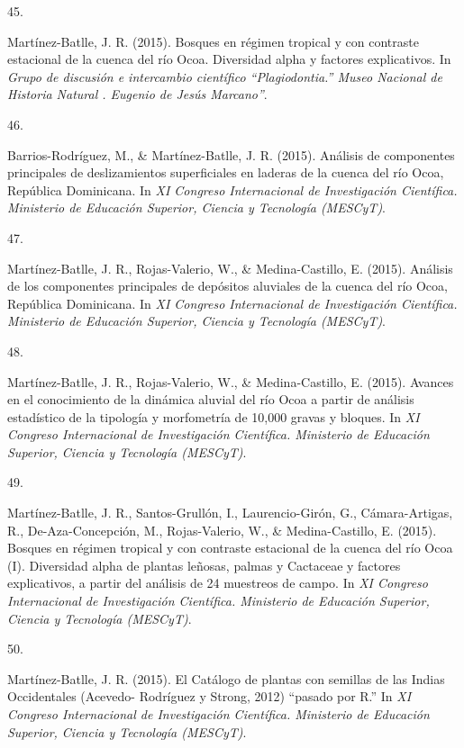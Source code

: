 \documentclass[10pt,a4paper,]{article}
\newlength{\cslhangindent}
\newlength{\csllabelwidth}
\newcommand{\CSLLeftMargin}[1]{\parbox[t]{\csllabelwidth}{\hfill #1~}}
\newcommand{\CSLRightInline}[1]{\parbox[t]{\linewidth - \cslhangindent - \csllabelwidth}{#1}\vspace{0.8ex}}
\begin{document}
\leavevmode\hypertarget{ref-Jose_Ramon_Martinez-Batlle_108095931}{}%
\CSLLeftMargin{45. }
\CSLRightInline{Martínez-Batlle, J. R. (2015). Bosques en régimen
tropical y con contraste estacional de la cuenca del río Ocoa.
Diversidad alpha y factores explicativos. In \emph{Grupo de discusión e
intercambio científico {``Plagiodontia.''} Museo Nacional de Historia
Natural . Eugenio de Jesús Marcano''}.}

\leavevmode\hypertarget{ref-Jose_Ramon_Martinez-Batlle_108046725}{}%
\CSLLeftMargin{46. }
\CSLRightInline{Barrios-Rodríguez, M., \& Martínez-Batlle, J. R. (2015).
Análisis de componentes principales de deslizamientos superficiales en
laderas de la cuenca del río Ocoa, República Dominicana. In \emph{XI
Congreso Internacional de Investigación Científica. Ministerio de
Educación Superior, Ciencia y Tecnología (MESCyT)}.}

\leavevmode\hypertarget{ref-Jose_Ramon_Martinez-Batlle_108047433}{}%
\CSLLeftMargin{47. }
\CSLRightInline{Martínez-Batlle, J. R., Rojas-Valerio, W., \&
Medina-Castillo, E. (2015). Análisis de los componentes principales de
depósitos aluviales de la cuenca del río Ocoa, República Dominicana. In
\emph{XI Congreso Internacional de Investigación Científica. Ministerio
de Educación Superior, Ciencia y Tecnología (MESCyT)}.}

\leavevmode\hypertarget{ref-Jose_Ramon_Martinez-Batlle_108047709}{}%
\CSLLeftMargin{48. }
\CSLRightInline{Martínez-Batlle, J. R., Rojas-Valerio, W., \&
Medina-Castillo, E. (2015). Avances en el conocimiento de la dinámica
aluvial del río Ocoa a partir de análisis estadístico de la tipología y
morfometría de 10,000 gravas y bloques. In \emph{XI Congreso
Internacional de Investigación Científica. Ministerio de Educación
Superior, Ciencia y Tecnología (MESCyT)}.}

\leavevmode\hypertarget{ref-Jose_Ramon_Martinez-Batlle_108052894}{}%
\CSLLeftMargin{49. }
\CSLRightInline{Martínez-Batlle, J. R., Santos-Grullón, I.,
Laurencio-Girón, G., Cámara-Artigas, R., De-Aza-Concepción, M.,
Rojas-Valerio, W., \& Medina-Castillo, E. (2015). Bosques en régimen
tropical y con contraste estacional de la cuenca del río Ocoa (I).
Diversidad alpha de plantas leñosas, palmas y Cactaceae y factores
explicativos, a partir del análisis de 24 muestreos de campo. In
\emph{XI Congreso Internacional de Investigación Científica. Ministerio
de Educación Superior, Ciencia y Tecnología (MESCyT)}.}

\leavevmode\hypertarget{ref-Jose_Ramon_Martinez-Batlle_108052927}{}%
\CSLLeftMargin{50. }
\CSLRightInline{Martínez-Batlle, J. R. (2015). El Catálogo de plantas
con semillas de las Indias Occidentales (Acevedo- Rodríguez y Strong,
2012) {``pasado por R.''} In \emph{XI Congreso Internacional de
Investigación Científica. Ministerio de Educación Superior, Ciencia y
Tecnología (MESCyT)}.}
\end{document}
